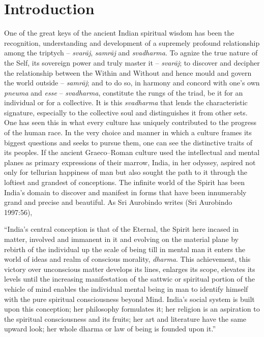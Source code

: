 \section{Introduction}

One of the great keys of the ancient Indian spiritual wisdom has been the recognition, understanding and development of a supremely profound relationship among the triptych – \textit{svarāj}, \textit{samrāj} and \textit{svadharma}. To agnize the true nature of the Self, its sovereign power and truly master it – \textit{svarāj}; to discover and decipher the relationship between the Within and Without and hence mould and govern the world outside – \textit{samrāj}; and to do so, in harmony and concord with one’s own \textit{pneuma} and \textit{esse} – \textit{svadharma}, constitute the rungs of the triad, be it for an individual or for a collective. It is this \textit{svadharma} that lends the characteristic signature, especially to the collective soul and distinguishes it from other sets. One has seen this in what every culture has uniquely contributed to the progress of the human race. In the very choice and manner in which a culture frames its biggest questions and seeks to pursue them, one can see the distinctive traits of its peoples. If the ancient Graeco–Roman culture used the intellectual and mental planes as primary expressions of their marrow, India, in her odyssey, aspired not only for tellurian happiness of man but also sought the path to it through the loftiest and grandest of conceptions. The infinite world of the Spirit has been India’s domain to discover and manifest in forms that have been innumerably grand and precise and beautiful. As Sri Aurobindo writes (Sri Aurobindo 1997:56),

\begin{myquote}
“India’s central conception is that of the Eternal, the Spirit here incased in matter, involved and immanent in it and evolving on the material plane by rebirth of the individual up the scale of being till in mental man it enters the world of ideas and realm of conscious morality, \textit{dharma}. This achievement, this victory over unconscious matter develops its lines, enlarges its scope, elevates its levels until the increasing manifestation of the sattwic or spiritual portion of the vehicle of mind enables the individual mental being in man to identify himself with the pure spiritual consciousness beyond Mind. India’s social system is built upon this conception; her philosophy formulates it; her religion is an aspiration to the spiritual consciousness and its fruits; her art and literature have the same upward look; her whole dharma or law of being is founded upon it.”
\end{myquote}

